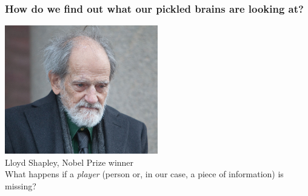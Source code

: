 \begin{frame}
\frametitle{How do we find out what our pickled brains are looking at?}

\begin{center}
\includegraphics[width=0.5\textwidth]{./images/lloyd_shapley}
\\
\small{Lloyd Shapley, Nobel Prize winner}\\
\vspace{5mm}
\small{What happens if a \textit{player} (person or, in our case, a piece of information) is missing?}
\end{center}   

\end{frame}